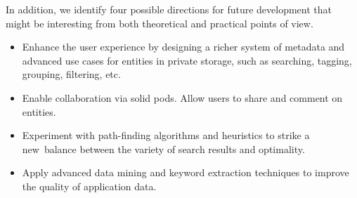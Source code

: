 In addition, we identify four possible directions for future development that might be interesting from both theoretical and practical points of view.

\begin{itemize}
\item Enhance the user experience by designing a richer system of metadata and advanced use cases for entities in private storage, such as searching, tagging, grouping, filtering, etc.
\item Enable collaboration via \acs{solid} pods. Allow users to share and comment on entities.
\item Experiment with path-finding algorithms and heuristics to strike a new~balance between the variety of search results and optimality.
\item Apply advanced data mining and keyword extraction techniques to improve the quality of application data.
\end{itemize}
